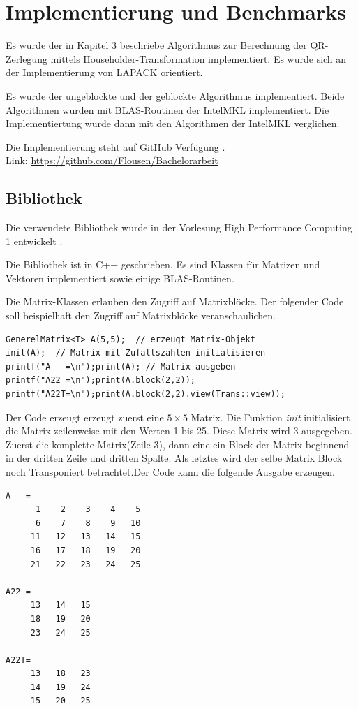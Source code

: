 \chapter{Implementierung und Benchmarks}
Es wurde der in Kapitel 3 beschriebe Algorithmus zur Berechnung der QR-Zerlegung mittels Householder-Transformation implementiert. Es wurde sich an der Implementierung von LAPACK orientiert.

Es wurde der ungeblockte und der geblockte Algorithmus implementiert. Beide Algorithmen wurden mit BLAS-Routinen der IntelMKL implementiert. Die Implementiertung wurde dann mit den Algorithmen der IntelMKL verglichen.

Die Implementierung steht auf GitHub Verfügung \cite{git}.\\
Link: \url{https://github.com/Flousen/Bachelorarbeit}

\section{Bibliothek}
Die verwendete Bibliothek wurde in der Vorlesung High Performance Computing 1 entwickelt \cite{HPC1}.

Die Bibliothek ist in C++ geschrieben. Es sind Klassen für Matrizen und Vektoren implementiert sowie einige BLAS-Routinen.

Die Matrix-Klassen erlauben den Zugriff auf Matrixblöcke. 
Der folgender Code soll beispielhaft den Zugriff auf Matrixblöcke veranschaulichen.

\begin{lstlisting}
GenerelMatrix<T> A(5,5);  // erzeugt Matrix-Objekt
init(A);  // Matrix mit Zufallszahlen initialisieren
printf("A   =\n");print(A); // Matrix ausgeben
printf("A22 =\n");print(A.block(2,2));
printf("A22T=\n");print(A.block(2,2).view(Trans::view));
\end{lstlisting}
Der Code erzeugt erzeugt zuerst eine $5 \times 5$ Matrix.
Die Funktion \textit{init} initialisiert die Matrix zeilenweise mit den Werten 1 bis 25.
Diese Matrix wird 3 ausgegeben. Zuerst die komplette Matrix(Zeile 3), dann eine ein Block der Matrix beginnend in der dritten Zeile und dritten Spalte. Als letztes wird der selbe Matrix Block noch Transponiert betrachtet.Der Code kann die folgende Ausgabe erzeugen.
\lstset{numbers=none}
\begin{lstlisting} 
A   = 
      1    2    3    4    5
      6    7    8    9   10
     11   12   13   14   15
     16   17   18   19   20
     21   22   23   24   25

A22 = 
     13   14   15
     18   19   20
     23   24   25

A22T= 
     13   18   23
     14   19   24
     15   20   25
\end{lstlisting}

